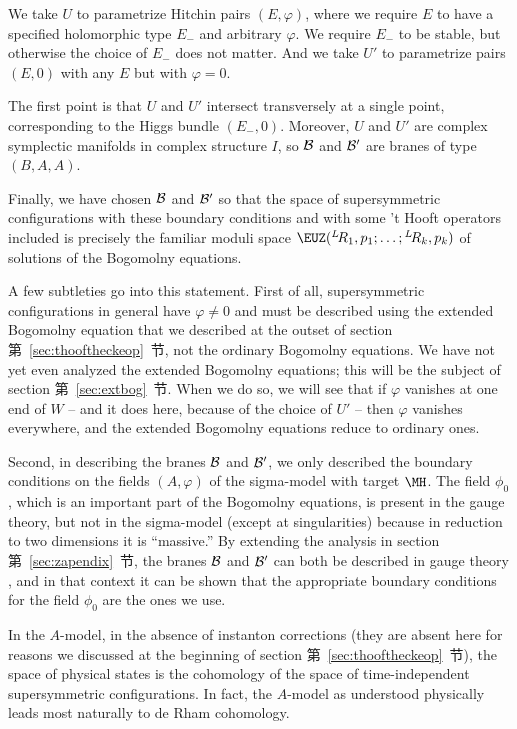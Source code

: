 We take $U$ to parametrize Hitchin pairs $(E,\varphi)$, where we
require $E$ to have a specified holomorphic type $E_-$ and
arbitrary $\varphi$. We require $E_-$ to be stable, but otherwise
the choice of $E_-$ does not matter.   And we take $U'$ to
parametrize pairs $(E,0)$ with any $E$ but with $\varphi=0$.

The first point is that $U$ and $U'$ intersect transversely at a
single point, corresponding to the Higgs bundle $(E_-,0)$. Moreover,
$U$ and $U'$ are complex symplectic manifolds in complex structure
$I$, so ${\cal B}$ and ${\cal B}'$ are branes of type $(B,A,A)$.

Finally, we have chosen ${\cal B}$ and ${\cal B}'$ so that the
space of supersymmetric configurations with these boundary
conditions and with some 't Hooft operators included is precisely
the familiar moduli space ${\EUZ}({}^L\negthinspace R_1,p_1;\dots;{}^L\negthinspace R_k,p_k)$ of
solutions of the Bogomolny equations.

 A few subtleties go into this statement.
First of all, supersymmetric configurations in general have
$\varphi\not= 0$ and must be described using the extended
Bogomolny equation that we described at the outset of section
第~\ref{sec:thooftheckeop}~节, not the ordinary Bogomolny equations.  We have not
yet even analyzed the extended Bogomolny equations; this will be
the subject of section 第~\ref{sec:extbog}~节. When we do so, we will see that if
$\varphi$ vanishes at one end of $W$ -- and it does here, because
of the choice of $U'$ -- then $\varphi$ vanishes everywhere, and
the extended Bogomolny equations reduce to ordinary ones.

Second, in describing the branes ${\cal B}$ and ${\cal B}'$, we
only described the boundary conditions on the fields $(A,\varphi)$
of the sigma-model with target $\MH$.  The field $\phi_0$, which
is an important part of the Bogomolny equations, is present in the
gauge theory, but not in the sigma-model (except at singularities)
because in reduction to two dimensions it is ``massive.''  By
extending the analysis in section 第~\ref{sec:zapendix}~节, the branes ${\cal B}$
and ${\cal B}'$ can both be described in gauge theory \cite{ref26}, and
in that context it can be shown that the appropriate boundary
conditions for the field $\phi_0$ are the ones we use.

\par{}

In the $A$-model, in the absence of instanton corrections (they
are absent here for reasons we discussed at the beginning of
section 第~\ref{sec:thooftheckeop}~节), the space of physical states is the
cohomology of the space of time-independent supersymmetric
configurations.  In fact, the $A$-model as understood physically
leads most naturally to de Rham cohomology.

